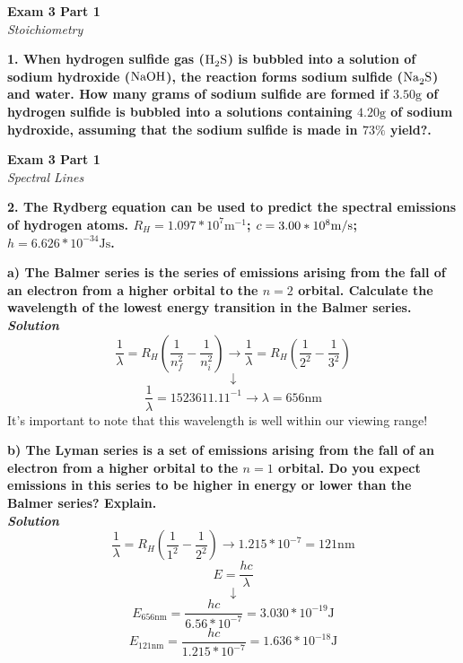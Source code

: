 \documentclass{article}
\begin{document}
    \begin{center}
        \textbf{Exam 3 Part 1}\\
        \textit{Stoichiometry}
    \end{center}
    \textbf{1. When hydrogen sulfide gas ($\ce{H2S}$) is bubbled into a solution of sodium hydroxide ($\ce{NaOH}$), the reaction forms sodium sulfide ($\ce{Na2S}$) and water. How many grams of sodium sulfide are formed if $3.50 \si{\gram}$ of hydrogen sulfide is bubbled into a solutions containing $4.20 \si{\gram}$ of sodium hydroxide, assuming that the sodium sulfide is made in $73\%$ yield?.}

    \pagebreak

    \begin{center}
        \textbf{Exam 3 Part 1}\\
        \textit{Spectral Lines}
    \end{center}
    \textbf{2. The Rydberg equation can be used to predict the spectral emissions of hydrogen atoms. $R_{H} = 1.097 * 10^{7}  \si{\meter^{-1}}$; $c = 3.00 * 10^{8} \si[per-mode=symbol]{\meter\per\second}$; $h = 6.626 * 10^{-34} \si{\joule} \si{\second}$.}

    \textbf{a)  The Balmer series is the series of emissions arising from the fall of an electron from a higher orbital to the $n = 2$ orbital. Calculate the wavelength of the lowest energy transition in the Balmer series.}\\
    \textbf{\textit{Solution}}
    $$\dfrac{1}{\lambda} = R_{H}(\dfrac{1}{n^{2}_{f}} - \dfrac{1}{n^{2}_{i}}) \rightarrow \dfrac{1}{\lambda} = R_{H}(\dfrac{1}{2^{2}} - \dfrac{1}{3^{2}})$$
    $$\downarrow$$
    $$\dfrac{1}{\lambda} = 1523611.11^{-1} \rightarrow \lambda = 656 \si{\nano\metre}$$
    It's important to note that this wavelength is well within our viewing range!

    \textbf{b) The Lyman series is a set of emissions arising from the fall of an electron from a higher orbital to the $n = 1$ orbital. Do you expect emissions in this series to be higher in energy or lower than the Balmer series? Explain.}\\
    \textbf{\textit{Solution}}
    $$\dfrac{1}{\lambda} = R_{H}(\dfrac{1}{1^{2}} - \dfrac{1}{2^{2}}) \rightarrow 1.215 * 10^{-7} = 121 \si{\nano\meter}$$
    $$E = \dfrac{hc}{\lambda} $$
    $$ \downarrow $$
    $$E_{656 \si{\nano\meter}} = \dfrac{hc}{6.56 * 10^{-7}}  = 3.030 * 10^{-19} \si{\joule}$$
    $$E_{121 \si{\nano\meter}} = \dfrac{hc}{1.215 * 10^{-7}} = 1.636 * 10^{-18} \si{\joule}$$
\end{document}
